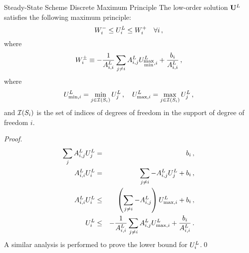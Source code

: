 \begin{theorem}{Steady-State Scheme Discrete Maximum Principle} The low-order
solution $\lowordersolution$ satisfies the following maximum principle:
\begin{equation}\label{eq:DMP_ss}
   W_i^-\leq U_i^L\leq W_i^+\quad\forall i \,,
\end{equation}
where
\begin{equation}
   W_i^\pm \equiv -\frac{1}{A^L_{i,i}}
      \sum\limits_{j\ne i}A^L_{i,j}
      U_{\substack{\max\\\min},i}^L
      + \frac{b_i}{A^L_{i,i}} \,,
\end{equation}
where
\[
  \solutionletter_{\min,i}^L = \min\limits_{j\in\indicescell[\support_i]}
    \solutionletter_j^L
  \eqc\quad
  \solutionletter_{\max,i}^L = \max\limits_{j\in\indicescell[\support_i]}
    \solutionletter_j^L
  \eqc
\]
and $\indicescell[\support_i]$ is the set of indices of degrees of freedom in
the support of degree of freedom $i$.
\end{theorem}

\begin{proof}
\begin{eqnarray*}
  \sum\limits_jA^L_{i,j}U_j^L & = & b_i\,,\\
  A^L_{i,i}U_i^L      & = & \sum\limits_{j\ne i}
    - A^L_{i,j}U_j^L + b_i\,,\\
  A^L_{i,i}U_i^L      & \le &
    \left(\sum\limits_{j\ne i} -A^L_{i,j}\right)U_{\max,i}^L
    + b_i\,,\\
  U_i^L & \le & -\frac{1}{A^L_{i,i}}
    \sum\limits_{j\ne i}A^L_{i,j}U_{\max,i}^L
    + \frac{b_i}{A^L_{i,i}} \,.
\end{eqnarray*}
A similar analysis is performed to prove the lower bound for
$U_i^L$.\qed
\end{proof}
